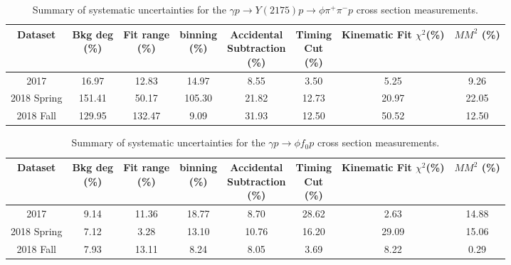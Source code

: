 \begin{table}[htbp]
    \small
    \centering
    \caption{Summary of systematic uncertainties for the $\gamma p \rightarrow Y(2175) p \rightarrow \phi \pi^{+} \pi^{-} p$ cross section measurements.}
    \label{tab.syserr.yphi2pi.1.1}
    \begin{tabular}{|c|c|c|c|c|c|c|c|}
        \hline
        Dataset&\thead{Bkg deg\\(\%)}&\thead{Fit range\\(\%)}&\thead{binning\\(\%)}&\thead{Accidental\\Subtraction\\(\%)}&\thead{Timing\\Cut\\(\%)}&\thead{Kinematic\\Fit $\chi^{2}$(\%)}&\thead{$MM^{2}$\\(\%)}\\
        \hline
        2017 & 16.97 & 12.83 & 14.97 & 8.55 & 3.50 & 5.25 & 9.26 \\ 
        2018 Spring & 151.41 & 50.17 & 105.30 & 21.82 & 12.73 & 20.97 & 22.05 \\ 
        2018 Fall & 129.95 & 132.47 & 9.09 & 31.93 & 12.50 & 50.52 & 12.50 \\
        \hline
    \end{tabular}
\end{table}

\begin{table}[htbp]
    \small
    \centering
    \caption{Summary of systematic uncertainties for the $\gamma p \rightarrow \phi f_{0} p$ cross section measurements.}
    \label{tab.syserr.phifo.1.1}
    \begin{tabular}{|c|c|c|c|c|c|c|c|}
        \hline
        Dataset&\thead{Bkg deg\\(\%)}&\thead{Fit range\\(\%)}&\thead{binning\\(\%)}&\thead{Accidental\\Subtraction\\(\%)}&\thead{Timing\\Cut\\(\%)}&\thead{Kinematic\\Fit $\chi^{2}$(\%)}&\thead{$MM^{2}$\\(\%)}\\
        \hline
        2017 & 9.14 & 11.36 & 18.77 & 8.70 & 28.62 & 2.63 & 14.88 \\ 
        2018 Spring & 7.12 & 3.28 & 13.10 & 10.76 & 16.20 & 29.09 & 15.06 \\ 
        2018 Fall & 7.93 & 13.11 & 8.24 & 8.05 & 3.69 & 8.22 & 0.29 \\
        \hline
    \end{tabular}
\end{table}

